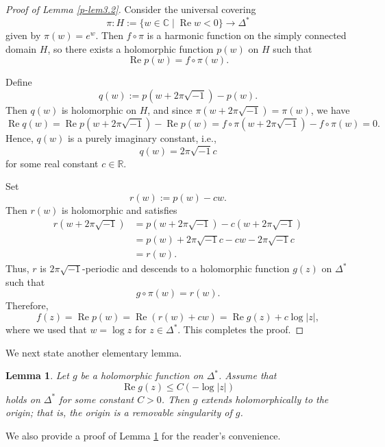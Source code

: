 \documentclass[12pt,twoside]{amsart}
\DeclareMathOperator{\re}{Re}
\newtheorem{lem}[thm]{Lemma}
\theoremstyle{definition}
\begin{document}
\begin{proof}[Proof of Lemma \ref{p-lem3.2}]
Consider the universal covering
\[
\pi \colon H := \{ w \in \mathbb{C} \mid \re w < 0 \} \to \Delta^*
\]
given by $\pi(w) = e^w$. Then $f \circ \pi$ 
is a harmonic function on the simply connected 
domain $H$, so there exists a holomorphic function $p(w)$ on $H$ such that
\[
\re p(w) = f \circ \pi(w).
\]

Define
\[
q(w) := p(w + 2\pi \sqrt{-1}) - p(w).
\]
Then $q(w)$ is holomorphic on $H$, and since $\pi(w + 2\pi \sqrt{-1}) = \pi(w)$, we have
\[
\re q(w) = \re p(w + 2\pi \sqrt{-1}) - \re p(w) = f \circ \pi(w+2\pi \sqrt{-1}) 
- f \circ \pi(w) = 0.
\]
Hence, $q(w)$ is a purely imaginary constant, i.e.,
\[
q(w) = 2\pi \sqrt{-1} c
\]
for some real constant $c \in \mathbb{R}$.

Set
\[
r(w) := p(w) - c w.
\]
Then $r(w)$ is holomorphic and satisfies
\begin{equation*}
\begin{split}
r(w + 2\pi \sqrt{-1})& = p(w + 2\pi \sqrt{-1}) 
- c(w + 2\pi \sqrt{-1}) \\&= p(w) + 2\pi \sqrt{-1} c - c w - 2\pi \sqrt{-1} c \\ &=r(w).
\end{split}
\end{equation*}
Thus, $r$ is $2\pi \sqrt{-1}$-periodic and descends to a holomorphic 
function $g(z)$ on $\Delta^*$ such that
\[
g \circ \pi(w) = r(w).
\]
Therefore,
\[
f(z) = \re p(w) = 
\re (r(w) + c w) = \re g(z) + c \log |z|,
\]
where we used that $w = \log z$ for $z \in \Delta^*$. This completes the proof.
\end{proof}

We next state another elementary lemma.

\begin{lem}\label{p-lem3.3}
Let $g$ be a holomorphic function on $\Delta^*$. Assume that
\[
\re g(z) \leq C (-\log |z|)
\]
holds on $\Delta^*$ for some constant 
$C > 0$. Then $g$ extends holomorphically to 
the origin; that is, the origin is a removable singularity of $g$.
\end{lem}

We also provide a proof of Lemma \ref{p-lem3.3} for the reader's convenience.
\end{document}
